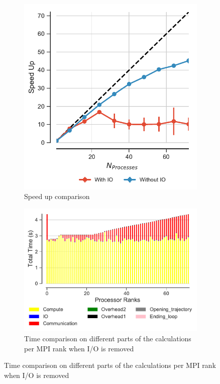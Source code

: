 \begin{figure}[ht!]
\centering
\begin{subfigure}{.35\textwidth}
  \includegraphics[width=\linewidth]{figures/speed_up-effect-of-IO.pdf}
  \caption{Speed up comparison}
  \label{fig:MPIspeedup-no-IO}
\end{subfigure}
\hfill
\begin{subfigure}{.5\textwidth}
  \includegraphics[width=\linewidth]{figures/BarPlot-rank-comparison-no-IO.pdf}
  \caption{Time comparison on different parts of the calculations per MPI rank when I/O is removed}
  \label{fig:MPIranks-no-IO}
\end{subfigure}


\end{figure}
